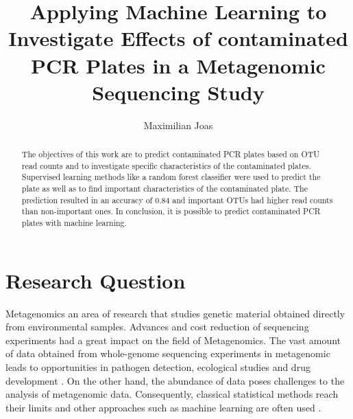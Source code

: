 \documentclass{svproc}
\begin{document}
\mainmatter              %
%
\title{Applying Machine Learning to Investigate Effects of contaminated PCR Plates in a Metagenomic Sequencing Study}
%
%
\author{Maximilian Joas }
%
%
%
%
\maketitle              %
%
\begin{abstract}
  The objectives of this work are to predict contaminated PCR plates based on OTU read counts and to investigate specific characteristics of the contaminated plates. Supervised learning methods like a random forest classifier were used to predict the plate as well as to find important characteristics of the contaminated plate. The prediction resulted in an accuracy of 0.84 and important OTUs had higher read counts than non-important ones. In conclusion, it is possible to predict contaminated PCR plates with machine learning.
\end{abstract}
%
%
\section{Research Question}
%
Metagenomics an area of research that studies genetic material obtained directly from environmental samples.
Advances and cost reduction of sequencing experiments had a great impact on the field of Metagenomics.
The vast amount of data obtained from whole-genome sequencing experiments in metagenomic leads to opportunities in pathogen detection, ecological studies and drug development \cite{THREE OPNE TABS}. On the other hand, the abundance of data poses challenges to the analysis of metagenomic data. Consequently, classical statistical methods reach their limits and other approaches such as machine learning are often used \cite{Soueidan2017}.\\
\end{document}
